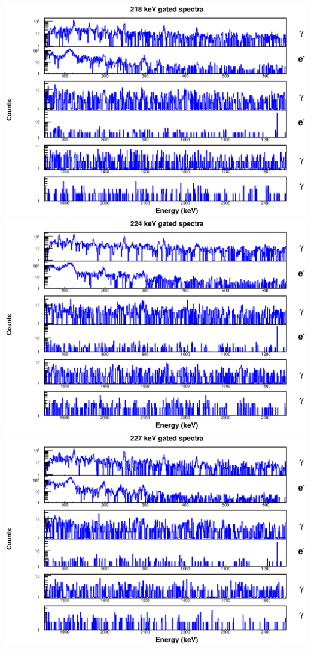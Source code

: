 \includegraphics[scale=0.8]{154Gd_Appendix/218_combined.eps}
\includegraphics[scale=0.8]{154Gd_Appendix/224_combined.eps}
\includegraphics[scale=0.8]{154Gd_Appendix/227_combined.eps}
